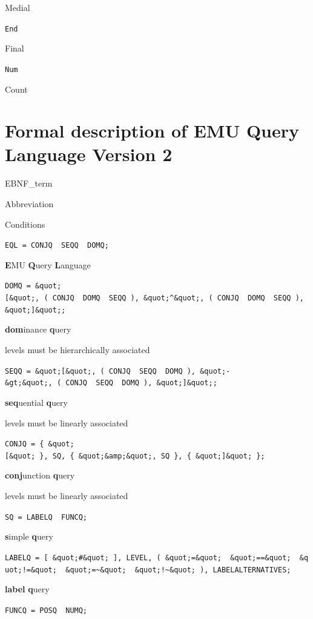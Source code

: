 \documentclass[]{book}
\theoremstyle{definition}
\theoremstyle{definition}
\theoremstyle{definition}
\theoremstyle{remark}
\begin{document}
Medial

\texttt{End}

Final

\texttt{Num}

Count

\hypertarget{formal-description-of-emu-query-language-version-2}{%
\section{Formal description of EMU Query Language Version
2}\label{formal-description-of-emu-query-language-version-2}}

EBNF\_term

Abbreviation

Conditions

\texttt{EQL\ =\ CONJQ\ \textbar{}\ SEQQ\ \textbar{}\ DOMQ;}

\textbf{E}MU \textbf{Q}uery \textbf{L}anguage

\texttt{DOMQ\ =\ \&quot;{[}\&quot;,\ (\ CONJQ\ \textbar{}\ DOMQ\ \textbar{}\ SEQQ\ ),\ \&quot;\^{}\&quot;,\ (\ CONJQ\ \textbar{}\ DOMQ\ \textbar{}\ SEQQ\ ),\ \&quot;{]}\&quot;;}

\textbf{dom}inance \textbf{q}uery

levels must be hierarchically associated

\texttt{SEQQ\ =\ \&quot;{[}\&quot;,\ (\ CONJQ\ \textbar{}\ SEQQ\ \textbar{}\ DOMQ\ ),\ \&quot;-\&gt;\&quot;,\ (\ CONJQ\ \textbar{}\ SEQQ\ \textbar{}\ DOMQ\ ),\ \&quot;{]}\&quot;;}

\textbf{seq}uential \textbf{q}uery

levels must be linearly associated

\texttt{CONJQ\ =\ \{\ \&quot;{[}\&quot;\ \},\ SQ,\ \{\ \&quot;\&amp;\&quot;,\ SQ\ \},\ \{\ \&quot;{]}\&quot;\ \};}

\textbf{conj}unction \textbf{q}uery

levels must be linearly associated

\texttt{SQ\ =\ LABELQ\ \textbar{}\ FUNCQ;}

\textbf{s}imple \textbf{q}uery

\texttt{LABELQ\ =\ {[}\ \&quot;\#\&quot;\ {]},\ LEVEL,\ (\ \&quot;=\&quot;\ \textbar{}\ \&quot;==\&quot;\ \textbar{}\ \&quot;!=\&quot;\ \textbar{}\ \&quot;=\textasciitilde{}\&quot;\ \textbar{}\ \&quot;!\textasciitilde{}\&quot;\ ),\ LABELALTERNATIVES;}

\textbf{label} \textbf{q}uery

\texttt{FUNCQ\ =\ POSQ\ \textbar{}\ NUMQ;}
\end{document}
